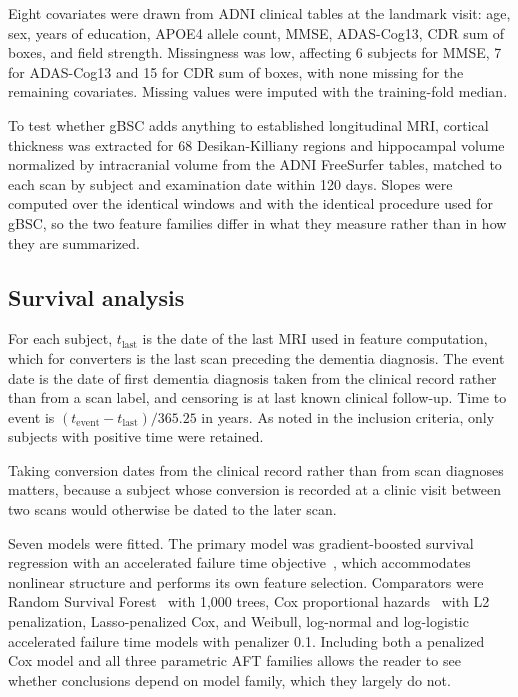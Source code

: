 \documentclass[blue]{ludusofficial}  %
\begin{document}
Eight covariates were drawn from ADNI clinical tables at the landmark visit: age, sex, years of education, APOE4 allele count, MMSE, ADAS-Cog13, CDR sum of boxes, and field strength. Missingness was low, affecting 6 subjects for MMSE, 7 for ADAS-Cog13 and 15 for CDR sum of boxes, with none missing for the remaining covariates. Missing values were imputed with the training-fold median.

To test whether gBSC adds anything to established longitudinal MRI, cortical thickness was extracted for 68 Desikan-Killiany regions and hippocampal volume normalized by intracranial volume from the ADNI FreeSurfer tables, matched to each scan by subject and examination date within 120 days. Slopes were computed over the identical windows and with the identical procedure used for gBSC, so the two feature families differ in what they measure rather than in how they are summarized.

\subsection{Survival analysis}

For each subject, $t_{\text{last}}$ is the date of the last MRI used in feature computation, which for converters is the last scan preceding the dementia diagnosis. The event date is the date of first dementia diagnosis taken from the clinical record rather than from a scan label, and censoring is at last known clinical follow-up. Time to event is $(t_{\text{event}} - t_{\text{last}})/365.25$ in years. As noted in the inclusion criteria, only subjects with positive time were retained.

Taking conversion dates from the clinical record rather than from scan diagnoses matters, because a subject whose conversion is recorded at a clinic visit between two scans would otherwise be dated to the later scan.

Seven models were fitted. The primary model was gradient-boosted survival regression with an accelerated failure time objective~\cite{barnwal2022survivalxgb}, which accommodates nonlinear structure and performs its own feature selection. Comparators were Random Survival Forest~\cite{ishwaran2008rsf} with 1,000 trees, Cox proportional hazards~\cite{cox1972} with L2 penalization, Lasso-penalized Cox, and Weibull, log-normal and log-logistic accelerated failure time models with penalizer 0.1. Including both a penalized Cox model and all three parametric AFT families allows the reader to see whether conclusions depend on model family, which they largely do not.
\end{document}
